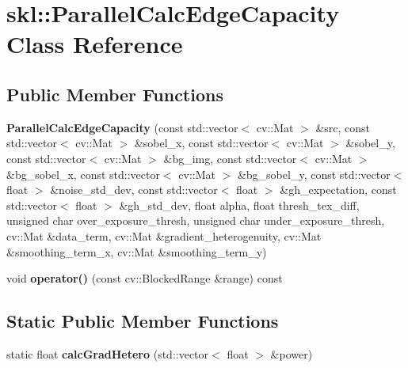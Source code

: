 \hypertarget{classskl_1_1_parallel_calc_edge_capacity}{}\section{skl\+:\+:Parallel\+Calc\+Edge\+Capacity Class Reference}
\label{classskl_1_1_parallel_calc_edge_capacity}
\subsection*{Public Member Functions}
\begin{DoxyCompactItemize}
\item 
\hypertarget{classskl_1_1_parallel_calc_edge_capacity_a29c94dc3e4e2e7d1d58ab38e92b01dbb}{}\label{classskl_1_1_parallel_calc_edge_capacity_a29c94dc3e4e2e7d1d58ab38e92b01dbb} 
{\bfseries Parallel\+Calc\+Edge\+Capacity} (const std\+::vector$<$ cv\+::\+Mat $>$ \&src, const std\+::vector$<$ cv\+::\+Mat $>$ \&sobel\+\_\+x, const std\+::vector$<$ cv\+::\+Mat $>$ \&sobel\+\_\+y, const std\+::vector$<$ cv\+::\+Mat $>$ \&bg\+\_\+img, const std\+::vector$<$ cv\+::\+Mat $>$ \&bg\+\_\+sobel\+\_\+x, const std\+::vector$<$ cv\+::\+Mat $>$ \&bg\+\_\+sobel\+\_\+y, const std\+::vector$<$ float $>$ \&noise\+\_\+std\+\_\+dev, const std\+::vector$<$ float $>$ \&gh\+\_\+expectation, const std\+::vector$<$ float $>$ \&gh\+\_\+std\+\_\+dev, float alpha, float thresh\+\_\+tex\+\_\+diff, unsigned char over\+\_\+exposure\+\_\+thresh, unsigned char under\+\_\+exposure\+\_\+thresh, cv\+::\+Mat \&data\+\_\+term, cv\+::\+Mat \&gradient\+\_\+heterogenuity, cv\+::\+Mat \&smoothing\+\_\+term\+\_\+x, cv\+::\+Mat \&smoothing\+\_\+term\+\_\+y)
\item 
\hypertarget{classskl_1_1_parallel_calc_edge_capacity_a90870970fb881a8df7fefcffcb5b4871}{}\label{classskl_1_1_parallel_calc_edge_capacity_a90870970fb881a8df7fefcffcb5b4871} 
void {\bfseries operator()} (const cv\+::\+Blocked\+Range \&range) const
\end{DoxyCompactItemize}
\subsection*{Static Public Member Functions}
\begin{DoxyCompactItemize}
\item 
\hypertarget{classskl_1_1_parallel_calc_edge_capacity_ad4b59e6047dbce5350f77681aa9986ba}{}\label{classskl_1_1_parallel_calc_edge_capacity_ad4b59e6047dbce5350f77681aa9986ba} 
static float {\bfseries calc\+Grad\+Hetero} (std\+::vector$<$ float $>$ \&power)
\end{DoxyCompactItemize}
